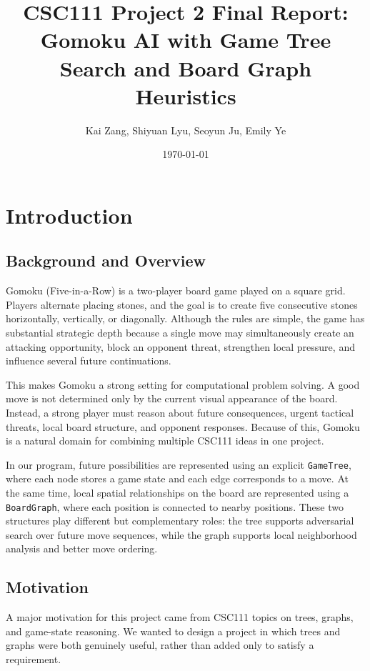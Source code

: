 \documentclass[11pt]{article}
\title{CSC111 Project 2 Final Report:\\[4pt] Gomoku AI with Game Tree Search and Board Graph Heuristics}
\author{Kai Zang, Shiyuan Lyu, Seoyun Ju, Emily Ye}
\date{\today}
\begin{document}
\maketitle

\section*{Introduction}

\subsection*{Background and Overview}

Gomoku (Five-in-a-Row) is a two-player board game played on a square grid.\cite{gomoku_ref} Players alternate placing stones, and the goal is to create five consecutive stones horizontally, vertically, or diagonally.\cite{gomoku_ref} Although the rules are simple, the game has substantial strategic depth because a single move may simultaneously create an attacking opportunity, block an opponent threat, strengthen local pressure, and influence several future continuations.

This makes Gomoku a strong setting for computational problem solving. A good move is not determined only by the current visual appearance of the board. Instead, a strong player must reason about future consequences, urgent tactical threats, local board structure, and opponent responses. Because of this, Gomoku is a natural domain for combining multiple CSC111 ideas in one project.\cite{proposal}

In our program, future possibilities are represented using an explicit \texttt{GameTree}, where each node stores a game state and each edge corresponds to a move. At the same time, local spatial relationships on the board are represented using a \texttt{BoardGraph}, where each position is connected to nearby positions. These two structures play different but complementary roles: the tree supports adversarial search over future move sequences, while the graph supports local neighborhood analysis and better move ordering.\cite{alpha_beta_ref}

\subsection*{Motivation}

A major motivation for this project came from CSC111 topics on trees, graphs, and game-state reasoning. We wanted to design a project in which trees and graphs were both genuinely useful, rather than added only to satisfy a requirement.
\end{document}

